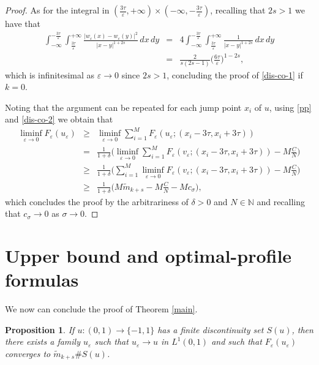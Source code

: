 \documentclass{article}
\newtheorem{proposition}[lemma]{Proposition}
\newcommand{\e}{\varepsilon}
\begin{document}
\begin{proof}
As for the integral in $(\frac{3\tau}{\e},+\infty)\times (-\infty, -\frac{3\tau}{\e})$, recalling that $2s>1$ we have that 
\begin{eqnarray*}
\int_{-\infty}^{-\frac{3\tau}{\e}} \int_{\frac{3\tau}{\e}}^{+\infty}  \frac{|w_\e(x)-w_\e(y)|^2}{|x-y|^{1+2s}}\, dx\, dy&=&4\int_{-\infty}^{-\frac{3\tau}{\e}} \int_{\frac{3\tau}{\e}}^{+\infty}  \frac{1}{|x-y|^{1+2s}}\, dx\, dy\\
&=&\frac{2}{s(2s-1)}\Big(\frac{6\tau}{\e}\Big)^{1-2s}, 
\end{eqnarray*}
which is infinitesimal as $\e\to 0$ since $2s>1$, 
concluding the proof of \eqref{dis-co-1} if $k=0$. 


\bigskip
{} Noting that the argument can be repeated for each jump point $x_i$ of $u$, using \eqref{pp} 
and \eqref{dis-co-2} we obtain that
\begin{eqnarray*}
\liminf_{\e\to 0} F_\e(u_\e)&\ge &\liminf_{\e\to 0} \sum_{i=1}^M F_\e(u_\e;(x_i-3\tau, x_i+3\tau))
\\ & =&\frac1{1+\delta}\Big( \liminf_{\e\to 0} \sum_{i=1}^M F_\e(v_\e;(x_i-3\tau, x_i+3\tau))-M \frac CN\Big)\\
&\ge& \frac1{1+\delta}\Big(\sum_{i=1}^M \liminf_{\e\to 0}  F_\e(v_\e;(x_i-3\tau, x_i+3\tau))- M\frac CN\Big)\\
&\ge& \frac1{1+\delta}\Big(M\widetilde m_{k+s} -M\frac CN -Mc_\sigma\Big),
\end{eqnarray*}
which concludes the proof by the arbitrariness of $\delta>0$ and $N\in\mathbb N$ and recalling that $c_\sigma\to 0$ as $\sigma\to 0$.
\end{proof}

\section{Upper bound and optimal-profile formulas}

We now can conclude the proof of Theorem \ref{main}.

\begin{proposition}
If $u\colon(0,1)\to\{-1,1\}$ has a finite discontinuity set $S(u)$, then there exists a family $u_\e$ such that $u_\e\to u$ in $L^1(0,1)$ and such that $F_\e(u_\e)$ converges to $\widetilde m_{k+s}\#S(u)$.
\end{proposition}
\end{document}
